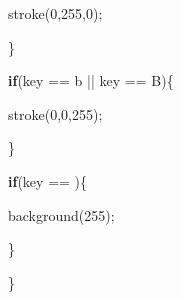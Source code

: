 \documentclass[
]{article}
\newenvironment{Shaded}{}{}
\newcommand{\CharTok}[1]{\textcolor[rgb]{0.25,0.44,0.63}{#1}}
\newcommand{\ControlFlowTok}[1]{\textcolor[rgb]{0.00,0.44,0.13}{\textbf{#1}}}
\newcommand{\DecValTok}[1]{\textcolor[rgb]{0.25,0.63,0.44}{#1}}
\newcommand{\FunctionTok}[1]{\textcolor[rgb]{0.02,0.16,0.49}{#1}}
\newcommand{\NormalTok}[1]{#1}
\newcommand{\OperatorTok}[1]{\textcolor[rgb]{0.40,0.40,0.40}{#1}}
\begin{document}
\begin{Shaded}
\begin{Highlighting}[]
        \FunctionTok{stroke}\OperatorTok{(}\DecValTok{0}\OperatorTok{,}\DecValTok{255}\OperatorTok{,}\DecValTok{0}\OperatorTok{);}

    \OperatorTok{\}}

    \ControlFlowTok{if}\OperatorTok{(}\NormalTok{key }\OperatorTok{==} \CharTok{\textquotesingle{}b\textquotesingle{}} \OperatorTok{||}\NormalTok{ key }\OperatorTok{==} \CharTok{\textquotesingle{}B\textquotesingle{}}\OperatorTok{)\{}

        \FunctionTok{stroke}\OperatorTok{(}\DecValTok{0}\OperatorTok{,}\DecValTok{0}\OperatorTok{,}\DecValTok{255}\OperatorTok{);}

    \OperatorTok{\}}

    \ControlFlowTok{if}\OperatorTok{(}\NormalTok{key }\OperatorTok{==} \CharTok{\textquotesingle{} \textquotesingle{}}\OperatorTok{)\{}

        \FunctionTok{background}\OperatorTok{(}\DecValTok{255}\OperatorTok{);}

    \OperatorTok{\}}

\OperatorTok{\}}
\end{Highlighting}
\end{Shaded}
\end{document}
